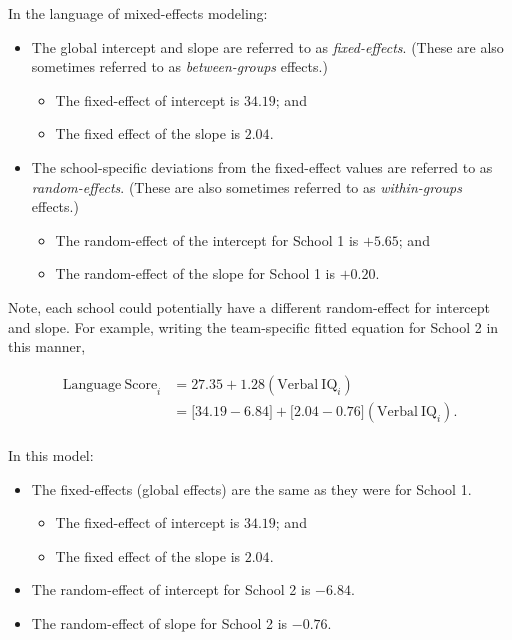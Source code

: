 \documentclass[]{book}
\providecommand{\tightlist}{%
  \setlength{\itemsep}{0pt}\setlength{\parskip}{0pt}}
\begin{document}
In the language of mixed-effects modeling:

\begin{itemize}
\tightlist
\item
  The global intercept and slope are referred to as \emph{fixed-effects}. (These are also sometimes referred to as \emph{between-groups} effects.)

  \begin{itemize}
  \tightlist
  \item
    The fixed-effect of intercept is \(34.19\); and
  \item
    The fixed effect of the slope is \(2.04\).
  \end{itemize}
\item
  The school-specific deviations from the fixed-effect values are referred to as \emph{random-effects}. (These are also sometimes referred to as \emph{within-groups} effects.)

  \begin{itemize}
  \tightlist
  \item
    The random-effect of the intercept for School 1 is \(+5.65\); and
  \item
    The random-effect of the slope for School 1 is \(+0.20\).
  \end{itemize}
\end{itemize}

Note, each school could potentially have a different random-effect for intercept and slope. For example, writing the team-specific fitted equation for School 2 in this manner,

\[
\begin{split}
\hat{\mathrm{Language~Score}_i} &= 27.35 + 1.28(\mathrm{Verbal~IQ}_i)\\
 &= \bigg[34.19 - 6.84\bigg] + \bigg[2.04 - 0.76\bigg](\mathrm{Verbal~IQ}_i).\\
\end{split}
\]

In this model:

\begin{itemize}
\tightlist
\item
  The fixed-effects (global effects) are the same as they were for School 1.

  \begin{itemize}
  \tightlist
  \item
    The fixed-effect of intercept is \(34.19\); and
  \item
    The fixed effect of the slope is \(2.04\).
  \end{itemize}
\item
  The random-effect of intercept for School 2 is \(-6.84\).
\item
  The random-effect of slope for School 2 is \(-0.76\).
\end{itemize}
\end{document}

